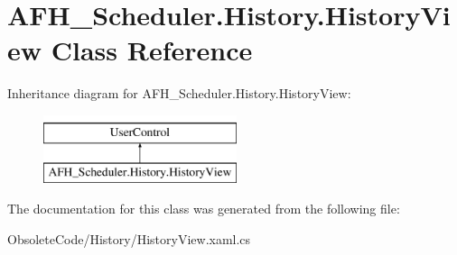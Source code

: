 \section{A\+F\+H\+\_\+\+Scheduler.\+History.\+History\+View Class Reference}
\label{class_a_f_h___scheduler_1_1_history_1_1_history_view}
Inheritance diagram for A\+F\+H\+\_\+\+Scheduler.\+History.\+History\+View\+:\begin{figure}[H]
\begin{center}
\leavevmode
\includegraphics[height=2.000000cm]{class_a_f_h___scheduler_1_1_history_1_1_history_view}
\end{center}
\end{figure}


The documentation for this class was generated from the following file\+:\begin{DoxyCompactItemize}
\item 
Obsolete\+Code/\+History/History\+View.\+xaml.\+cs\end{DoxyCompactItemize}
